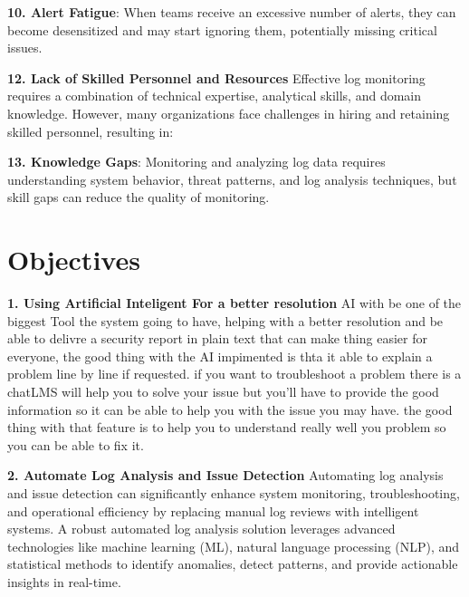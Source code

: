 \textbf{10. Alert Fatigue}: When teams receive an excessive number of alerts, they can become desensitized and may start ignoring them, potentially missing critical issues.



\textbf{12. Lack of Skilled Personnel and Resources}
Effective log monitoring requires a combination of technical expertise, analytical skills, and domain knowledge. However, many organizations face challenges in hiring and retaining skilled personnel, resulting in:


\textbf{13. Knowledge Gaps}: Monitoring and analyzing log data requires understanding system behavior, threat patterns, and log analysis techniques, but skill gaps can reduce the quality of monitoring.













\section{Objectives}

\textbf{1. Using Artificial Inteligent For a better resolution}
AI with be one of the biggest Tool the system going to have, helping with a better resolution and be able to delivre a security report in plain text that can make thing easier for everyone, the good thing with the AI impimented is thta it able to explain a problem line by line if requested. if you want to troubleshoot a problem there is a chatLMS will help you to solve your issue but you'll have to provide the good information so it can be able to help you with the issue you may have. the good thing with that feature is to help you to understand really well you problem so you can be able to fix it.

\textbf{2. Automate Log Analysis and Issue Detection}
Automating log analysis and issue detection can significantly enhance system monitoring, troubleshooting, and operational efficiency by replacing manual log reviews with intelligent systems. A robust automated log analysis solution leverages advanced technologies like machine learning (ML), natural language processing (NLP), and statistical methods to identify anomalies, detect patterns, and provide actionable insights in real-time. 


